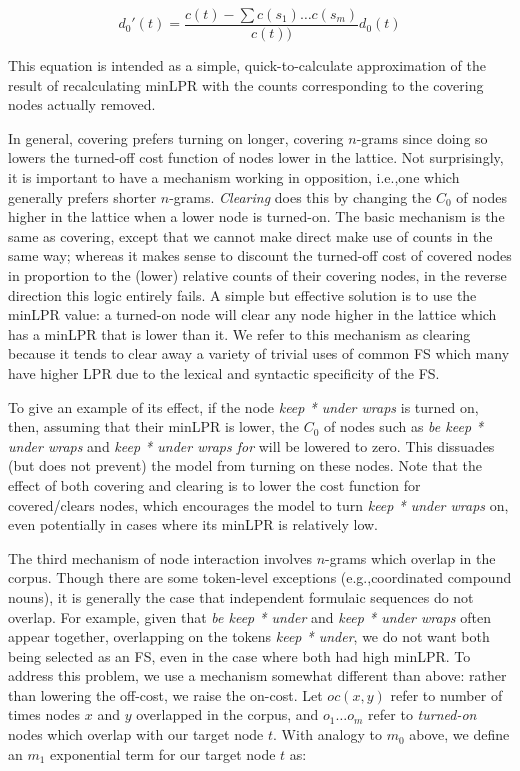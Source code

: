 \documentclass[11pt]{article}
\makeatletter
\def \eg {e.g.,\@ }
\def \ie {i.e.,\@ }
\makeatother
\begin{document}
\begin{displaymath}
d_{0}'(t) = \frac{c(t) - \sum{c(s_1)\ldots c(s_m)}}{c(t))} d_0(t)

\end{displaymath}

\noindent
This equation is intended as a simple, quick-to-calculate approximation of the result of recalculating minLPR with the counts corresponding to the covering nodes actually removed.

In general, covering prefers turning on longer, covering $n$-grams since doing so lowers the turned-off cost function of nodes lower in the lattice. Not surprisingly, it is important to have a mechanism working in opposition, \ie one which generally prefers shorter $n$-grams. \textit{Clearing} does this by changing the $C_0$ of nodes higher in the lattice when a lower node is turned-on. The basic mechanism is the same as covering, except that we cannot make direct make use of counts in the same way; whereas it makes sense to discount the turned-off cost of covered nodes in proportion to the (lower) relative counts of their covering nodes, in the reverse direction this logic entirely fails. A simple but effective solution is to use the minLPR value: a turned-on node will clear any node higher in the lattice which has a minLPR that is lower than it. We refer to this mechanism as clearing because it tends to clear away a variety of trivial uses of common FS which many have higher LPR due to the lexical and syntactic specificity of the FS.

To give an example of its effect, if the node \emph{keep * under wraps} is turned on, then, assuming that their minLPR is lower, the $C_0$ of nodes such as \emph{be keep * under wraps} and \emph{keep * under wraps for} will be lowered to zero. This dissuades (but does not prevent) the model from turning on these nodes. Note that the effect of both covering and clearing is to lower the cost function for covered/clears nodes, which encourages the model to turn \emph{keep * under wraps} on, even potentially in cases where its minLPR is relatively low.

The third mechanism of node interaction involves $n$-grams which overlap in the corpus. Though there are some token-level exceptions (\eg coordinated compound nouns), it is generally the case that independent formulaic sequences do not overlap. For example, given that \emph{be keep * under} and \emph{keep * under wraps} often appear together, overlapping on the tokens \emph{keep * under}, we do not want both being selected as an FS, even in the case where both had high minLPR. To address this problem, we use a mechanism somewhat different than above: rather than lowering the off-cost, we raise the on-cost. Let $oc(x,y)$ refer to number of times nodes $x$ and $y$ overlapped in the corpus, and $o_1\ldots o_m$ refer to \emph{turned-on} nodes which overlap with our target node $t$. With analogy to $m_0$ above, we define an $m_1$ exponential term for our target node $t$ as:
\end{document}
